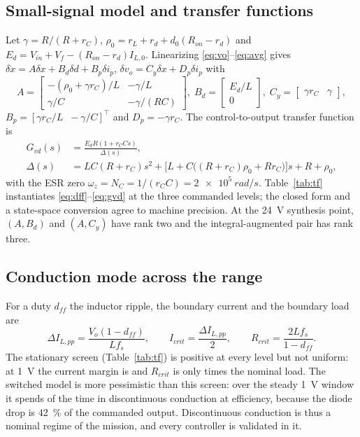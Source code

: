 \subsection{Small-signal model and transfer functions}
Let $\gamma=R/(R+r_C)$, $\rho_0=r_L+r_d+d_0(R_{on}-r_d)$ and
$E_d=V_{in}+V_f-(R_{on}-r_d)I_{L,0}$. Linearizing \eqref{eq:vo}--\eqref{eq:avg}
gives $\delta\dot x=A\delta x+B_d\delta d+B_p\delta i_p$,
$\delta v_o=C_y\delta x+D_p\delta i_p$ with
\begin{equation}
A=\begin{bmatrix}-(\rho_0+\gamma r_C)/L & -\gamma/L\\ \gamma/C & -\gamma/(RC)\end{bmatrix},\;
B_d=\begin{bmatrix}E_d/L\\0\end{bmatrix},\;
C_y=\begin{bmatrix}\gamma r_C & \gamma\end{bmatrix},
\label{eq:ss}
\end{equation}
$B_p=[\gamma r_C/L\;\;-\gamma/C]^\top$ and $D_p=-\gamma r_C$. The control-to-output
transfer function is
\begin{equation}
\begin{aligned}
G_{vd}(s)&=\frac{E_dR(1+r_CCs)}{\Delta(s)},\\
\Delta(s)&=LC(R+r_C)s^2+\big[L+C\big((R+r_C)\rho_0+Rr_C\big)\big]s+R+\rho_0 ,
\end{aligned}
\label{eq:gvd}
\end{equation}
with the ESR zero $\omega_{z}=N_C=1/(r_CC)=\SI{2e5}{rad/s}$. Table~\ref{tab:tf}
instantiates \eqref{eq:dff}--\eqref{eq:gvd} at the three commanded levels; the
closed form and a state-space conversion agree to machine precision. At the
\SI{24}{V} synthesis point, $(A,B_d)$ and $(A,C_y)$ have rank two and the
integral-augmented pair has rank three.



\subsection{Conduction mode across the range}
For a duty $d_{ff}$ the inductor ripple, the boundary current and the boundary
load are
\begin{equation}
\Delta I_{L,pp}=\frac{V_o(1-d_{ff})}{Lf_s},\qquad I_{crit}=\frac{\Delta I_{L,pp}}{2},\qquad
R_{crit}=\frac{2Lf_s}{1-d_{ff}} .
\label{eq:ccm}
\end{equation}
The stationary screen (Table~\ref{tab:tf}) is positive at every level but not
uniform: at \SI{1}{V} the current margin is \CCMmargin{} and $R_{crit}$ is only
\CCMratio{} times the nominal load. The switched model is more pessimistic than
this screen: over the steady \SI{1}{V} window it spends \DCMone{} of the time in
discontinuous conduction at \ETAone{} efficiency, because the diode drop is
\SI{42}{\percent} of the commanded output. Discontinuous conduction is thus a
nominal regime of the mission, and every controller is validated in it.


